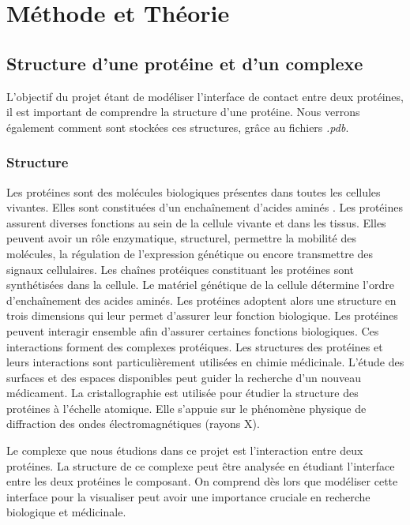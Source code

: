 \chapter{Méthode et Théorie}

\section{Structure d'une protéine et d'un complexe}

L'objectif du projet étant de modéliser l'interface de contact entre deux protéines,
il est important de comprendre la structure d'une protéine. Nous verrons également
comment sont stockées ces structures, grâce au fichiers \textit{.pdb}.

\subsection*{Structure}

Les protéines sont des molécules biologiques présentes dans toutes les cellules vivantes.
Elles sont constituées d'un enchaînement d'acides aminés \cite{Prot}.
Les protéines assurent diverses fonctions au sein de la cellule vivante et dans les tissus.
Elles peuvent avoir un rôle enzymatique, structurel, permettre la mobilité des molécules, la
régulation de l'expression génétique ou encore transmettre des signaux cellulaires.
Les chaînes protéiques constituant les protéines sont synthétisées dans la cellule. Le
matériel génétique de la cellule détermine l'ordre d'enchaînement des acides aminés.
Les protéines adoptent alors une structure en trois dimensions qui leur permet d'assurer
 leur fonction biologique. Les protéines peuvent interagir ensemble afin d'assurer certaines
fonctions biologiques. Ces interactions forment des complexes protéiques. Les structures
 des protéines et leurs interactions sont particulièrement utilisées en chimie médicinale.
L'étude des surfaces et des espaces disponibles peut guider la recherche d'un nouveau
médicament. La cristallographie est utilisée pour étudier la structure des protéines à
l'échelle atomique. Elle s'appuie sur le phénomène physique de diffraction des ondes
électromagnétiques (rayons X).

Le complexe que nous étudions dans ce projet est l'interaction entre
deux protéines. La structure de ce complexe peut être analysée en étudiant l'interface
entre les deux protéines le composant. On comprend dès lors que modéliser cette interface
pour la visualiser peut avoir une importance cruciale en recherche biologique et médicinale.

